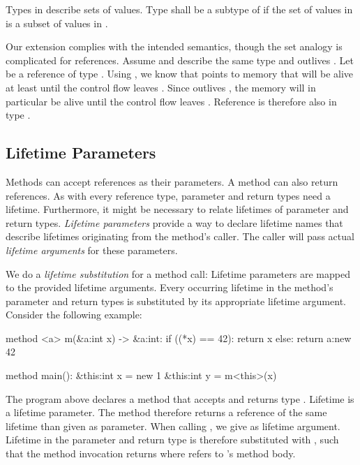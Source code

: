 Types in \whiley describe sets of values.
Type  shall be a subtype of  if the set of values in  is a subset of values in  \cite[p. 37]{WLS}.

Our extension complies with the intended semantics, though the set analogy is complicated for references.
Assume  and  describe the same type and  outlives .
Let  be a reference of type .
Using , we know that  points to memory that will be alive at least until the control flow leaves .
Since  outlives , the memory will in particular be alive until the control flow leaves .
Reference  is therefore also in type .


\subsection{Lifetime Parameters}\label{section:design-lifetime-parameters}

Methods can accept references as their parameters.
A method can also return references.
As with every reference type, parameter and return types need a lifetime.
Furthermore, it might be necessary to relate lifetimes of parameter and return types.
\emph{Lifetime parameters} provide a way to declare lifetime names that describe lifetimes originating from the method's caller.
The caller will pass actual \emph{lifetime arguments} for these parameters.

We do a \emph{lifetime substitution} for a method call:
Lifetime parameters are mapped to the provided lifetime arguments.
Every occurring lifetime in the method's parameter and return types is substituted by its appropriate lifetime argument.
Consider the following example:

\begin{whileycode}
method <a> m(&a:int x) -> &a:int:
	if ((*x) == 42):
		return x
	else:
		return a:new 42

method main():
	&this:int x = new 1
	&this:int y = m<this>(x)
\end{whileycode}

The program above declares a method  that accepts and returns type .
Lifetime  is a lifetime parameter.
The method therefore returns a reference of the same lifetime than given as parameter.
When calling , we give  as lifetime argument.
Lifetime  in the parameter and return type is therefore substituted with , such that the method invocation returns  where  refers to 's method body.


